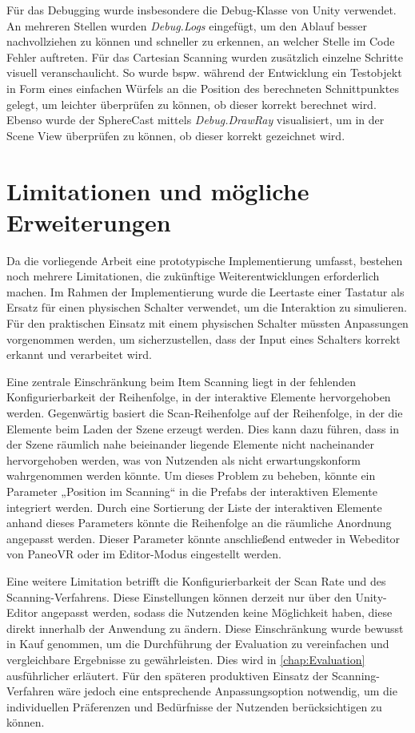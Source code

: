 Für das Debugging wurde insbesondere die Debug-Klasse von Unity verwendet. An mehreren Stellen wurden \textit{Debug.Logs} eingefügt, um den Ablauf besser nachvollziehen zu können und schneller zu erkennen, an welcher Stelle im Code Fehler auftreten. Für das Cartesian Scanning wurden zusätzlich einzelne Schritte visuell veranschaulicht. So wurde bspw. während der Entwicklung ein Testobjekt in Form eines einfachen Würfels an die Position des berechneten Schnittpunktes gelegt, um leichter überprüfen zu können, ob dieser korrekt berechnet wird. Ebenso wurde der SphereCast mittels \textit{Debug.DrawRay} visualisiert, um in der Scene View überprüfen zu können, ob dieser korrekt gezeichnet wird.

\section{Limitationen und mögliche Erweiterungen}

Da die vorliegende Arbeit eine prototypische Implementierung umfasst, bestehen noch mehrere Limitationen, die zukünftige Weiterentwicklungen erforderlich machen.
Im Rahmen der Implementierung wurde die Leertaste einer Tastatur als Ersatz für einen physischen Schalter verwendet, um die Interaktion zu simulieren. Für den praktischen Einsatz mit einem physischen Schalter müssten Anpassungen vorgenommen werden, um sicherzustellen, dass der Input eines Schalters korrekt erkannt und verarbeitet wird. 

Eine zentrale Einschränkung beim Item Scanning liegt in der fehlenden Konfigurierbarkeit der Reihenfolge, in der interaktive Elemente hervorgehoben werden. Gegenwärtig basiert die Scan-Reihenfolge auf der Reihenfolge, in der die Elemente beim Laden der Szene erzeugt werden. Dies kann dazu führen, dass in der Szene räumlich nahe beieinander liegende Elemente nicht nacheinander hervorgehoben werden, was von Nutzenden als nicht erwartungskonform wahrgenommen werden könnte. Um dieses Problem zu beheben, könnte ein Parameter „Position im Scanning“ in die Prefabs der interaktiven Elemente integriert werden. Durch eine Sortierung der Liste der interaktiven Elemente anhand dieses Parameters könnte die Reihenfolge an die räumliche Anordnung angepasst werden. Dieser Parameter könnte anschließend entweder in Webeditor von PaneoVR oder im Editor-Modus eingestellt werden. 

Eine weitere Limitation betrifft die Konfigurierbarkeit der Scan Rate und des Scanning-Verfahrens. Diese Einstellungen können derzeit nur über den Unity-Editor angepasst werden, sodass die Nutzenden keine Möglichkeit haben, diese direkt innerhalb der Anwendung zu ändern. Diese Einschränkung wurde bewusst in Kauf genommen, um die Durchführung der Evaluation zu vereinfachen und vergleichbare Ergebnisse zu gewährleisten. Dies wird in \autoref{chap:Evaluation} ausführlicher erläutert. 
Für den späteren produktiven Einsatz der Scanning-Verfahren wäre jedoch eine entsprechende Anpassungsoption notwendig, um die individuellen Präferenzen und Bedürfnisse der Nutzenden berücksichtigen zu können.


